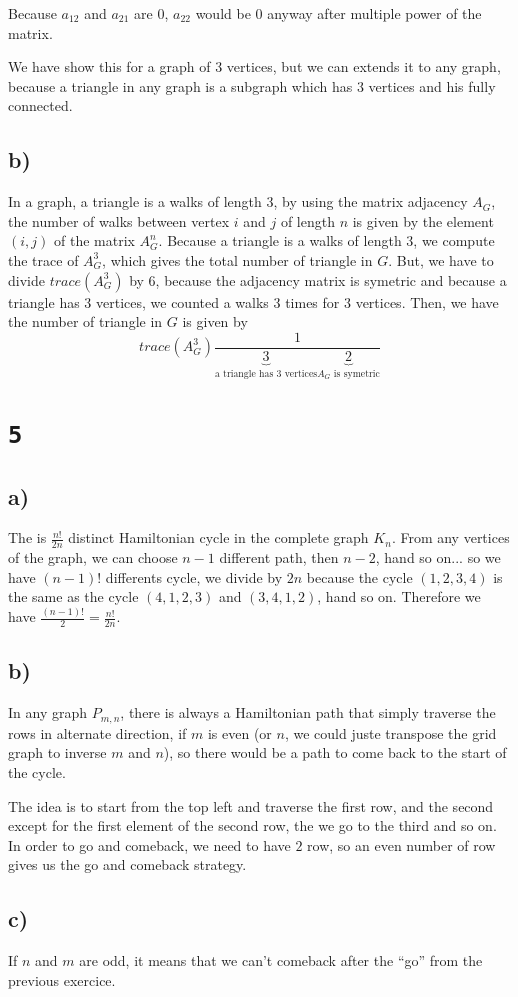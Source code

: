 \documentclass[a4paper,11pt]{report}
\begin{document}
Because $a_{12}$ and $a_{21}$ are $0$, $a_{22}$ would be $0$ anyway after
multiple power of the matrix.

We have show this for a graph of $3$ vertices, but we can extends it to any
graph, because a triangle in any graph is a subgraph which has $3$ vertices and
his fully connected.

\subsection*{b)}

In a graph, a triangle is a walks of length $3$, by using the matrix adjacency
$A_G$, the number of walks between vertex $i$ and $j$ of length $n$ is given by
the element $(i,j)$ of the matrix $A_G^n$. Because a triangle is a walks of
length $3$, we compute the trace of $A_G^3$, which gives the total number of
triangle in $G$. But, we have to divide $trace(A_G^3)$ by $6$, because the
adjacency matrix is symetric and because a triangle has $3$ vertices, we counted
a walks $3$ times for $3$ vertices. Then, we have the number of triangle in $G$
is given by
\[
  trace(A_G^3) \frac{1}{\underbrace{3}_{\text{a triangle has $3$ vertices}} \underbrace{2}_{\text{$A_G$ is symetric}}}
\]

\section*{\texttt{5}}

\subsection*{a)}

The is $\frac{n!}{2n}$ distinct Hamiltonian cycle in the complete graph $K_n$.
From any vertices of the graph, we can choose $n-1$ different path, then $n-2$,
hand so on... so we have $(n-1)!$ differents cycle, we divide by $2n$ because the
cycle $(1,2,3,4)$ is the same as the cycle $(4,1,2,3)$ and $(3,4,1,2)$, hand so
on. Therefore we have $\frac{(n-1)!}{2} = \frac{n!}{2n}$.

\subsection*{b)}

In any graph $P_{m,n}$, there is always a Hamiltonian path that simply traverse
the rows in alternate direction, if $m$ is even (or $n$, we could juste
transpose the grid graph to inverse $m$ and $n$), so there would be a path to
come back to the start of the cycle.

The idea is to start from the top left and traverse the first row, and the
second except for the first element of the second row, the we go to the third
and so on. In order to go and comeback, we need to have $2$ row, so an even
number of row gives us the go and comeback strategy.

\subsection*{c)}

If $n$ and $m$ are odd, it means that we can't comeback after the ``go'' from
the previous exercice.
\end{document}
